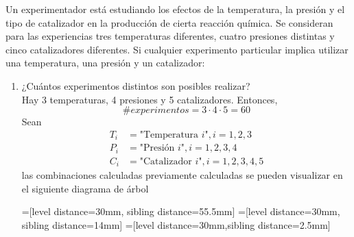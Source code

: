 \item Un experimentador está estudiando los efectos de la temperatura, la presión y el tipo de catalizador en la producción de cierta reacción química. Se consideran para las experiencias tres temperaturas diferentes, cuatro presiones distintas y cinco catalizadores diferentes. Si cualquier experimento particular implica utilizar una temperatura, una presión y un catalizador:
    \begin{enumerate}
        \item ¿Cuántos experimentos distintos son posibles realizar?\e\\
            Hay 3 temperaturas, 4 presiones y 5 catalizadores. Entonces,\[\#experimentos=3\cdot4\cdot5=60\]
            Sean \begin{align*}
                T_i&=\text{"Temperatura $i$"},i=1,2,3\\
                P_i&=\text{"Presión $i$"}, i=1,2,3,4\\
                C_i&=\text{"Catalizador $i$"},i=1,2,3,4,5
            \end{align*}
            las combinaciones calculadas previamente calculadas se pueden visualizar en el siguiente diagrama de árbol
            \begin{center}
                =[level distance=30mm, sibling distance=55.5mm]
                =[level distance=30mm, sibling distance=14mm]
                =[level distance=30mm,sibling distance=2.5mm]
\end{center}
\end{enumerate}
